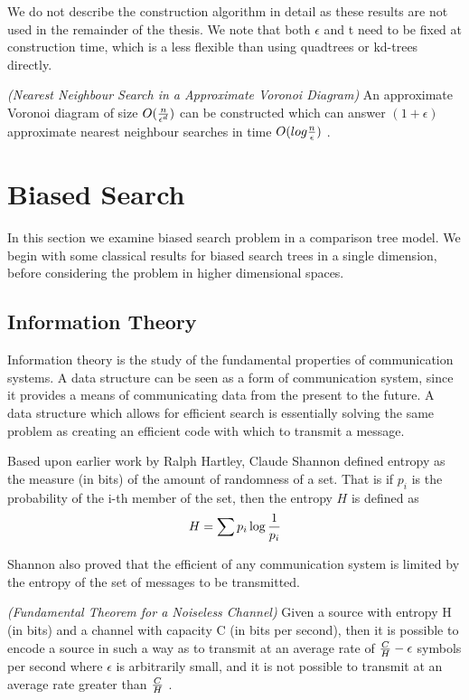 \documentclass[mcs]{scsthesis}
\begin{document}
We do not describe the construction algorithm in detail as these results are
not used in the remainder of the thesis. We note that both \(\epsilon\) and t
need to be fixed at construction time, which is a less flexible than using
quadtrees or kd-trees directly.

\begin{thm} \emph{(Nearest Neighbour Search in a Approximate Voronoi Diagram)} 
An approximate Voronoi diagram of size \(O({n \over \epsilon ^ d})\) can be
constructed which can answer \((1 + \epsilon)\) approximate nearest neighbour
searches in time \(O(log {n \over \epsilon})\) \cite{arya-avd}.
\end{thm}

\section{Biased Search}

In this section we examine biased search problem in a comparison tree model.
We begin with some classical results for biased search trees in a single
dimension, before considering the problem in higher dimensional spaces.

\subsection{Information Theory}

Information theory is the study of the fundamental properties of communication
systems. A data structure can be seen as a form of communication system, since
it provides a means of communicating data from the present to the future.
A data structure which allows for efficient search is essentially solving the
same problem as creating an efficient code with which to transmit a message.

Based upon earlier work by Ralph Hartley, Claude Shannon \cite{claudeshannonwasagod}
defined entropy as the measure (in bits) of the amount of randomness of a set.
That is if \(p_i\) is the probability of the i-th member of the set, then the
entropy \(H\) is defined as
$$
H = \sum{ p_i \log{1 \over p_i}}
$$

Shannon also proved that the efficient of any communication system is limited
by the entropy of the set of messages to be transmitted.

\begin{thm} \emph{(Fundamental Theorem for a Noiseless Channel)} 
Given a source with entropy H (in bits) and a channel with capacity C (in bits
per second), then it is possible to encode a source in such a way as to
transmit at an average rate of \({C \over H} - \epsilon\) symbols per second
where \(\epsilon\) is arbitrarily small, and it is not possible to transmit
at an average rate greater than \(C \over H\) \cite{claudeshannonwasagod}.
\end{thm}
\end{document}
